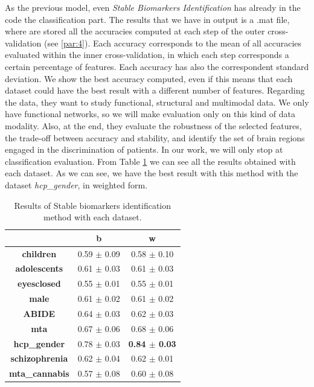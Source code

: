 As the previous model, even \textit{Stable Biomarkers Identification} has already in the code the classification part. The results that we have in output is a .mat file, where are stored all the accuracies computed at each step of the outer cross-validation (see \ref{par:4}). Each accuracy corresponds to the mean of all accuracies evaluated within the inner cross-validation, in which each step corresponds a certain percentage of features. Each accuracy has also the correspondent standard deviation. We show the best accuracy computed, even if this means that each dataset could have the best result with a different number of features. Regarding the data, they want to study functional, structural and multimodal data. We only have functional networks, so we will make evaluation only on this kind of data modality. Also, at the end, they evaluate the robustness of the selected features, the trade-off between accuracy and stability, and identify the set of brain regions engaged in the discrimination of patients. In our work, we will only stop at classification evaluation. From Table \ref{tab:biomarkers} we can see all the results obtained with each dataset. As we can see, we have the best result with this method with the dataset \textit{hcp\_gender}, in weighted form.
\vspace{0.5cm}

\begin{table}
	\centering
	\begin{tabular}{c|l|c} 
		\toprule
		& \multicolumn{1}{c|}{b} & w                \\ 
		\midrule
		\textbf{children}      & 0.59 $\pm$ 0.09        & 0.58 $\pm$ 0.10  \\
		\textbf{adolescents}   & 0.61 $\pm$ 0.03        & 0.61 $\pm$ 0.03  \\
		\textbf{eyesclosed}    & 0.55 $\pm$ 0.01        & 0.55 $\pm$ 0.01  \\
		\textbf{male}          & 0.61 $\pm$ 0.02        & 0.61 $\pm$ 0.02  \\
		\textbf{ABIDE}         & 0.64 $\pm$ 0.03        & 0.62 $\pm$ 0.03  \\
		\textbf{mta}           & 0.67 $\pm$ 0.06        & 0.68 $\pm$ 0.06  \\
		\textbf{hcp\_gender}   & 0.78 $\pm$ 0.03        & \textbf{0.84 $\pm$ 0.03}  \\
		\textbf{schizophrenia} & 0.62 $\pm$ 0.04        & 0.62 $\pm$ 0.01  \\
		\textbf{mta\_cannabis} & 0.57 $\pm$ 0.08        & 0.60 $\pm$ 0.08 
	\end{tabular}
\caption{Results of Stable biomarkers identification method with each dataset.}
\label{tab:biomarkers}
\end{table}

